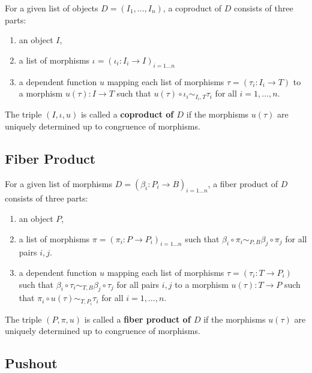 \begin{definition}
 For a given list of objects $D = ( I_1, \dots, I_n )$, a coproduct of $D$ consists of three parts:
 \begin{enumerate}
  \item an object $I$,
  \item a list of morphisms $\iota = ( \iota_i: I_i \rightarrow I )_{i = 1 \dots n}$
  \item a dependent function $u$ mapping each list of morphisms $\tau = ( \tau_i: I_i \rightarrow T )$
  to a morphism $u( \tau ): I \rightarrow T$ such that $u( \tau ) \circ \iota_i \sim_{I_i, T} \tau_i$ for all $i = 1, \dots, n$.
 \end{enumerate}
 The triple $( I, \iota, u )$ is called a \textbf{coproduct of $D$} if the morphisms $u( \tau )$ are uniquely determined up to
 congruence of morphisms.
\end{definition}

\subsection{Fiber Product}

\begin{definition}
 For a given list of morphisms $D = ( \beta_i: P_i \rightarrow B )_{i = 1 \dots n}$, 
 a fiber product of $D$ consists of three parts:
 \begin{enumerate}
  \item an object $P$,
  \item a list of morphisms $\pi = ( \pi_i: P \rightarrow P_i )_{i = 1 \dots n}$ such that
        $\beta_i \circ \pi_i  \sim_{P, B} \beta_j \circ \pi_j$ for all pairs $i,j$.
  \item a dependent function $u$ mapping each list of morphisms
        $\tau = ( \tau_i: T \rightarrow P_i )$ such that
        $\beta_i \circ \tau_i  \sim_{T, B} \beta_j \circ \tau_j$ for all pairs $i,j$
        to a morphism $u( \tau ): T \rightarrow P$ such that
        $\pi_i \circ u( \tau ) \sim_{T, P_i} \tau_i$ for all $i = 1, \dots, n$.
 \end{enumerate}
 The triple $( P, \pi, u )$ is called a \textbf{fiber product of $D$} if the morphisms $u( \tau )$ are uniquely determined up to
 congruence of morphisms.
\end{definition}

\subsection{Pushout}

